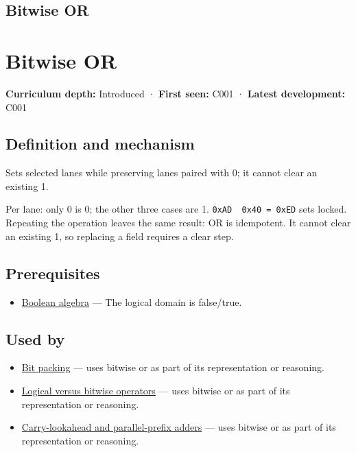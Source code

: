 \hypertarget{appendix-a427ce8ce8a6}{}
\section*{Bitwise OR}
\chapter{Bitwise OR}\label{appendix-a427ce8ce8a6-bitwise-or}

\textbf{Curriculum depth:} Introduced · \textbf{First seen:} C001 · \textbf{Latest development:} C001

\section{Definition and mechanism}\label{appendix-a427ce8ce8a6-definition-and-mechanism}

Sets selected lanes while preserving lanes paired with 0; it cannot clear an existing 1.

Per lane: only 0 is 0; the other three cases are 1. \texttt{0xAD\ \textbar{}\ 0x40\ =\ 0xED} sets locked. Repeating the operation leaves the same result: OR is idempotent. It cannot clear an existing 1, so replacing a field requires a clear step.

\section{Prerequisites}\label{appendix-a427ce8ce8a6-prerequisites}

\begin{itemize}
\tightlist
\item
  \hyperref[appendix-24475e1596a8]{Boolean algebra} --- The logical domain is false/true.
\end{itemize}

\section{Used by}\label{appendix-a427ce8ce8a6-used-by}

\begin{itemize}
\tightlist
\item
  \hyperref[appendix-1f9963e1a5d1]{Bit packing} --- uses bitwise or as part of its representation or reasoning.
\item
  \hyperref[appendix-fe6b457d68d8]{Logical versus bitwise operators} --- uses bitwise or as part of its representation or reasoning.
\item
  \hyperref[appendix-b5c46b2d94ff]{Carry-lookahead and parallel-prefix adders} --- uses bitwise or as part of its representation or reasoning.
\end{itemize}

